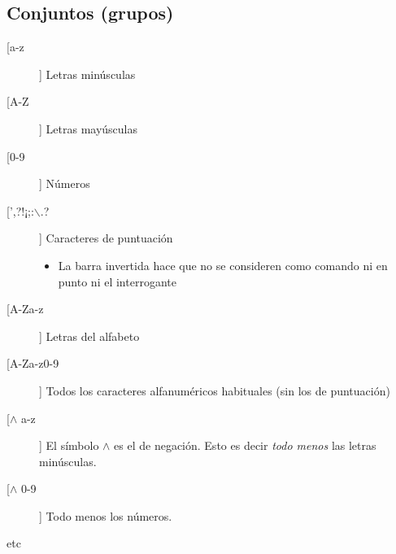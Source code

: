 \subsection{Conjuntos (grupos)}
\begin{description}
	\item[[a-z]] Letras minúsculas
	\item[[A-Z]] Letras mayúsculas
	\item[[0-9]] Números
	\item[[',?!¡;:$\backslash$.?]] Caracteres de puntuación
	\begin{itemize} 
		\item La barra invertida hace que no se consideren como comando ni en punto ni el interrogante
	\end{itemize}
	\item[[A-Za-z]] Letras del alfabeto
	\item[[A-Za-z0-9]] Todos los caracteres alfanuméricos habituales (sin los de puntuación)
	\item[[$\wedge$ a-z]] El símbolo $\wedge$ es el de negación. Esto es decir \emph{todo menos} las letras minúsculas.
	\item[[$\wedge$ 0-9]] Todo menos los números.
	\item[etc]
\end{description}
